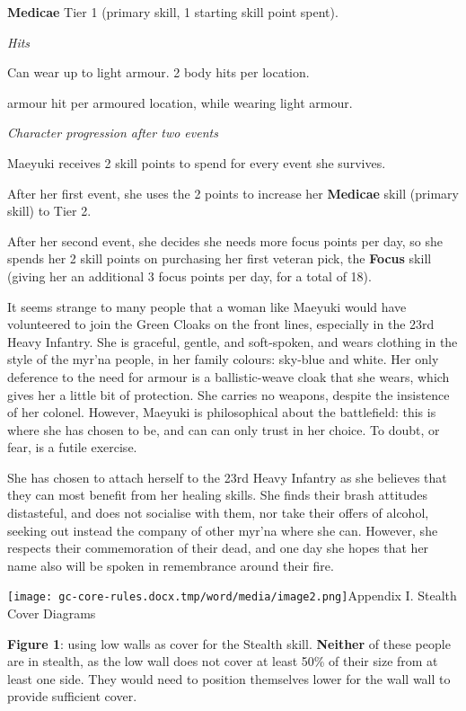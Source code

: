 \documentclass{scrbook}
\begin{document}
\textbf{Medicae} Tier 1 (primary skill, 1 starting skill point spent).

\textit{Hits}

Can wear up to light armour. 2 body hits per location.

armour hit per armoured location, while wearing light armour.

\textit{Character progression after two events}

Maeyuki receives 2 skill points to spend for every event she survives.

After her first event, she uses the 2 points to increase her \textbf{Medicae} skill (primary skill) to Tier 2.

After her second event, she decides she needs more focus points per day, so she spends her 2 skill points on purchasing her first veteran pick, the \textbf{Focus} skill (giving her an additional 3 focus points per day, for a total of 18).

It seems strange to many people that a woman like Maeyuki would have volunteered to join the Green Cloaks on the front lines, especially in the 23rd Heavy Infantry. She is graceful, gentle, and soft-spoken, and wears clothing in the style of the myr'na people, in her family colours: sky-blue and white. Her only deference to the need for armour is a ballistic-weave cloak that she wears, which gives her a little bit of protection. She carries no weapons, despite the insistence of her colonel. However, Maeyuki is philosophical about the battlefield: this is where she has chosen to be, and can can only trust in her choice. To doubt, or fear, is a futile exercise.

She has chosen to attach herself to the 23rd Heavy Infantry as she believes that they can most benefit from her healing skills. She finds their brash attitudes distasteful, and does not socialise with them, nor take their offers of alcohol, seeking out instead the company of other myr'na where she can. However, she respects their commemoration of their dead, and one day she hopes that her name also will be spoken in remembrance around their fire.

\texttt{[image: gc-core-rules.docx.tmp/word/media/image2.png]}Appendix I. Stealth Cover Diagrams

\textbf{Figure 1}: using low walls as cover for the Stealth skill. \textbf{Neither} of these people are in stealth, as the low wall does not cover at least 50\% of their size from at least one side. They would need to position themselves lower for the wall wall to provide sufficient cover.
\end{document}

